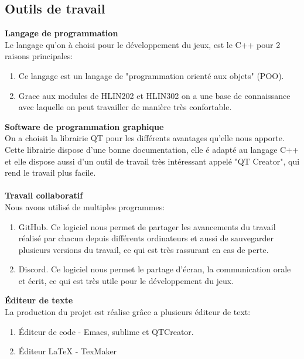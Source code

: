 \documentclass{article}
\begin{document}
\subsection{Outils de travail}
\textbf{\large Langage de programmation}\\
Le langage qu'on à choisi pour le développement du jeux, est le C++ pour 2 raisons principales:

\begin{enumerate}
\item Ce langage est un langage de "programmation orienté aux objets" (POO).
\item Grace aux modules de HLIN202 et HLIN302 on a une base de connaissance avec laquelle on peut travailler de manière très confortable.
\end{enumerate}
\textbf{\large Software de programmation graphique}\\
On a choisit la librairie QT pour les différents avantages qu'elle nous apporte. Cette librairie dispose d'une bonne documentation, elle é adapté au langage C++ et elle dispose aussi d'un outil de travail très intéressant appelé "QT Creator", qui rend le travail plus facile.\\~\\
\textbf{\large Travail collaboratif}\\
Nous avons utilisé de multiples programmes:
\begin{enumerate}
\item GitHub. Ce logiciel nous permet de partager les avancements du travail réalisé par chacun depuis différents ordinateurs et aussi de sauvegarder plusieurs versions du travail, ce qui est très rassurant en cas de perte.
\item Discord. Ce logiciel nous permet le partage d'écran, la communication orale et écrit, ce qui est très utile pour le développement du jeux.
\end{enumerate}
\textbf{\large Éditeur de texte}\\
La production du projet est réalise grâce a plusieurs éditeur de text:
\begin{enumerate}
\item Éditeur de code -
Emacs, sublime et QTCreator.
\item Éditeur \LaTeX{} - TexMaker
\end{enumerate} 
\newpage
\end{document}
